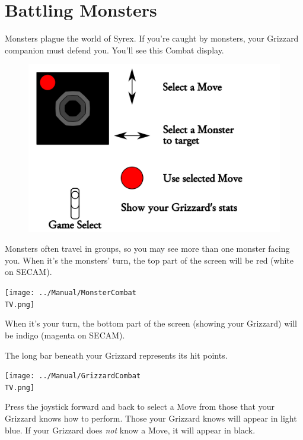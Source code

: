 \documentclass[10pt,twocolumn,openany,article]{memoir}
\newcommand\TV{NTSC} %
\begin{document}
\ifdefined\ATARIAGESAVE
\pagebreak
\fi

\section{Battling Monsters}

Monsters plague the  world of Syrex. If you're caught  by monsters, your
Grizzard  companion must  defend  you. You'll  see  this Combat  display.

\begin{figure}[t]
  \includegraphics[width=2\columnwidth]{../Manual/CombatControls.png}
\end{figure}

Monsters often  travel in groups, so  you may see more  than one monster
facing you.  When it's the  monsters' turn, the  top part of  the screen
will be red (white on SECAM).

\begin{center}
  \texttt{[image: ../Manual/MonsterCombat\\TV.png]}
\end{center}

When  it's your  turn,  the  bottom part  of  the  screen (showing  your
Grizzard) will be indigo (magenta on SECAM). 

The long bar beneath your Grizzard represents its hit points.

\begin{center}
  \texttt{[image: ../Manual/GrizzardCombat\\TV.png]}
\end{center}

Press the  joystick forward and  back to select  a Move from  those that
your  Grizzard knows  how to  perform.  Those your  Grizzard knows  will
appear in light  blue. If your Grizzard does \emph{not}  know a Move, it
will appear in black.
\end{document}
